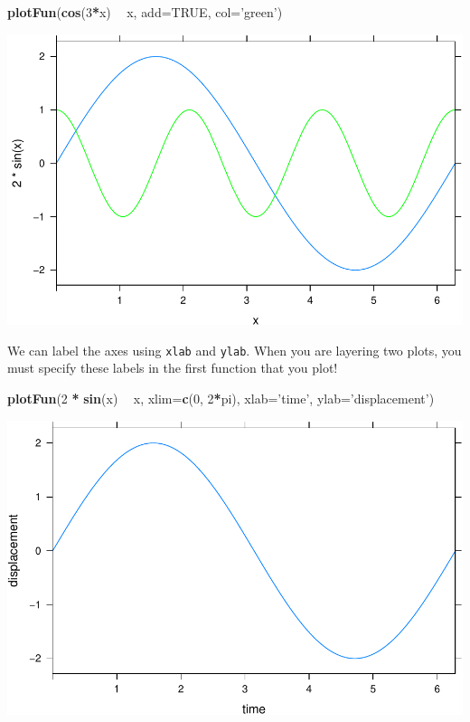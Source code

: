 \documentclass[
]{book}
\newenvironment{Shaded}{\begin{snugshade}}{\end{snugshade}}
\newcommand{\DataTypeTok}[1]{\textcolor[rgb]{0.13,0.29,0.53}{#1}}
\newcommand{\DecValTok}[1]{\textcolor[rgb]{0.00,0.00,0.81}{#1}}
\newcommand{\KeywordTok}[1]{\textcolor[rgb]{0.13,0.29,0.53}{\textbf{#1}}}
\newcommand{\NormalTok}[1]{#1}
\newcommand{\OperatorTok}[1]{\textcolor[rgb]{0.81,0.36,0.00}{\textbf{#1}}}
\newcommand{\OtherTok}[1]{\textcolor[rgb]{0.56,0.35,0.01}{#1}}
\newcommand{\StringTok}[1]{\textcolor[rgb]{0.31,0.60,0.02}{#1}}
\begin{document}
\begin{Shaded}
\begin{Highlighting}[]
\KeywordTok{plotFun}\NormalTok{(}\KeywordTok{cos}\NormalTok{(}\DecValTok{3}\OperatorTok{*}\NormalTok{x) }\OperatorTok{~}\StringTok{ }\NormalTok{x, }\DataTypeTok{add=}\OtherTok{TRUE}\NormalTok{, }\DataTypeTok{col=}\StringTok{'green'}\NormalTok{)}
\end{Highlighting}
\end{Shaded}

\includegraphics{_bookdown_files/math135_handbook_files/figure-latex/unnamed-chunk-31-2.pdf}

We can label the axes using \texttt{xlab} and \texttt{ylab}. When you are layering two plots, you must specify these labels in the first function that you plot!

\begin{Shaded}
\begin{Highlighting}[]
\KeywordTok{plotFun}\NormalTok{(}\DecValTok{2} \OperatorTok{*}\StringTok{ }\KeywordTok{sin}\NormalTok{(x) }\OperatorTok{~}\StringTok{ }\NormalTok{x, }\DataTypeTok{xlim=}\KeywordTok{c}\NormalTok{(}\DecValTok{0}\NormalTok{, }\DecValTok{2}\OperatorTok{*}\NormalTok{pi), }\DataTypeTok{xlab=}\StringTok{'time'}\NormalTok{, }\DataTypeTok{ylab=}\StringTok{'displacement'}\NormalTok{)}
\end{Highlighting}
\end{Shaded}

\includegraphics{_bookdown_files/math135_handbook_files/figure-latex/unnamed-chunk-32-1.pdf}
\end{document}
